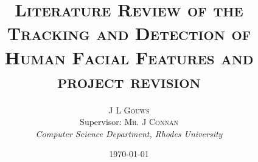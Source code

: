 \documentclass[11pt,a4paper]{article}
\title{\vspace{\fill}
\textsc{Literature Review of the Tracking and Detection of Human Facial Features and project revision}
}
\author{\textsc{J L Gouws}
\\Supervisor: \textsc{Mr. J Connan}
\\ \emph{Computer Science Department, Rhodes University}}
\date{\today\\
[1cm]
}
\begin{document}
\maketitle

\vspace{\fill}
\newpage


%
%
%
%





%
%



 

\end{document}
